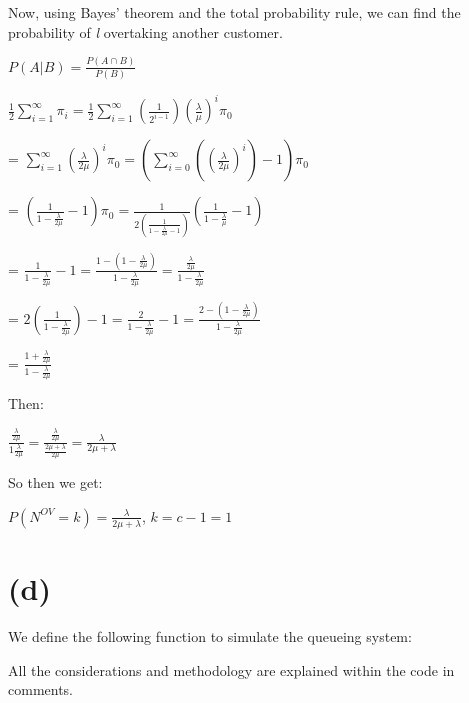 \documentclass[]{article}
\begin{document}
Now, using Bayes' theorem and the total probability rule, we can find
the probability of \emph{l} overtaking another customer.

\(P(A | B) = \frac{P(A \cap B)}{P(B)}\)

\(\frac{1}{2} \sum_{i=1}^{\infty} \pi_i = \frac{1}{2} \sum_{i=1}^{\infty} (\frac{1}{2^{i-1}}) (\frac{\lambda}{\mu})^{i} \pi_0\)

=
\(\sum_{i=1}^{\infty} (\frac{\lambda}{2 \mu})^i \pi_0 = (\sum_{i=0}^{\infty} ((\frac{\lambda}{2 \mu})^i) - 1) \pi_0\)

=
\((\frac{1}{1-\frac{\lambda}{2 \mu}} - 1) \pi_0 = \frac{1}{2 (\frac{1}{1 - \frac{\lambda}{2 \mu} - 1})} (\frac{1}{1 - \frac{\lambda}{\mu}} - 1)\)

=
\(\frac{1}{1 - \frac{\lambda}{2 \mu}} - 1 = \frac{1 - (1 - \frac{\lambda}{2 \mu})}{1 - \frac{\lambda}{2 \mu}} = \frac{\frac{\lambda}{2 \mu}}{1 - \frac{\lambda}{2 \mu}}\)

=
\(2 (\frac{1}{1 - \frac{\lambda}{2 \mu}}) - 1 = \frac{2}{1 - \frac{\lambda}{2 \mu}} - 1 = \frac{2 - (1 - \frac{\lambda}{2 \mu})}{1 - \frac{\lambda}{2 \mu}}\)

= \(\frac{1 + \frac{\lambda}{2 \mu}}{1 - \frac{\lambda}{2 \mu}}\)

Then:

\(\frac{\frac{\lambda}{2 \mu}}{1 \frac{\lambda}{2 \mu}} = \frac{\frac{\lambda}{2 \mu}}{\frac{2 \mu + \lambda}{2 \mu}} = \frac{\lambda}{2 \mu + \lambda}\)

So then we get:

\(P(N^{OV} = k) = \frac{\lambda}{2 \mu + \lambda}\), \(k = c-1 = 1\)

\newpage

\hypertarget{d-1}{%
\section{(d)}\label{d-1}}

We define the following function to simulate the queueing system:

All the considerations and methodology are explained within the code in
comments.
\end{document}
